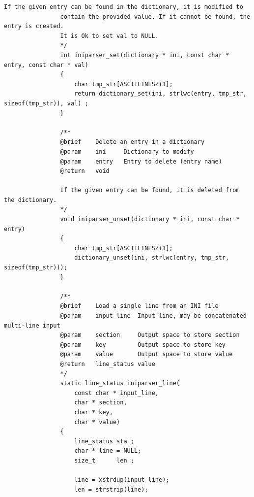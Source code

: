\documentclass{article}
\begin{document}
\begin{Verbatim}[gobble=8]
                If the given entry can be found in the dictionary, it is modified to
                contain the provided value. If it cannot be found, the entry is created.
                It is Ok to set val to NULL.
                */
                int iniparser_set(dictionary * ini, const char * entry, const char * val)
                {
                    char tmp_str[ASCIILINESZ+1];
                    return dictionary_set(ini, strlwc(entry, tmp_str, sizeof(tmp_str)), val) ;
                }
                
                /**
                @brief    Delete an entry in a dictionary
                @param    ini     Dictionary to modify
                @param    entry   Entry to delete (entry name)
                @return   void
                
                If the given entry can be found, it is deleted from the dictionary.
                */
                void iniparser_unset(dictionary * ini, const char * entry)
                {
                    char tmp_str[ASCIILINESZ+1];
                    dictionary_unset(ini, strlwc(entry, tmp_str, sizeof(tmp_str)));
                }
                
                /**
                @brief    Load a single line from an INI file
                @param    input_line  Input line, may be concatenated multi-line input
                @param    section     Output space to store section
                @param    key         Output space to store key
                @param    value       Output space to store value
                @return   line_status value
                */
                static line_status iniparser_line(
                    const char * input_line,
                    char * section,
                    char * key,
                    char * value)
                {
                    line_status sta ;
                    char * line = NULL;
                    size_t      len ;
                
                    line = xstrdup(input_line);
                    len = strstrip(line);
                

\end{Verbatim}
\end{document}

